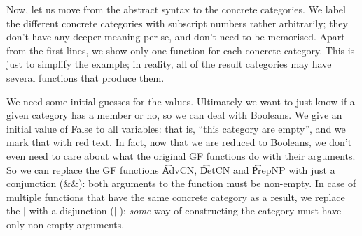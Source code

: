 Now, let us move from the \gf{} abstract syntax to the \pmcfg{} concrete
categories. We label the different concrete categories with
subscript numbers rather arbitrarily; they don't have any deeper
meaning per se, and don't need to be memorised. Apart from the first
lines, we show only one function for each concrete category. This is
just to simplify the example; in reality, all of the result categories
may have several functions that produce them.

\begin{EmptyItem}
\begin{Highlighting}[]
  \OtherTok{::=}    \FunctionTok{|}    \NormalTok{;}
  \OtherTok{::=}   \FunctionTok{|}  \NormalTok{;}
  \OtherTok{::=}    \NormalTok{;}
  \OtherTok{::=}    \NormalTok{;}
  \OtherTok{::=}    \NormalTok{;}
  \OtherTok{::=}  \NormalTok{;}
  \OtherTok{::=}  \NormalTok{;}
  \OtherTok{::=}  \NormalTok{;}
\end{Highlighting}
\end{EmptyItem}



We need some initial guesses for the values. Ultimately we want to
just know if a given category has a member or no, so we can deal with
Booleans. We give an initial value of False to all variables: that is,
``this category are empty'', and we mark that with red text.
In fact, now that we are reduced to Booleans, we don’t even need to
care about what the original GF functions do with their arguments. So
we can replace the GF functions \t{AdvCN}, \t{DetCN} and \t{PrepNP}
with just a conjunction ($\&\&$): both arguments to the function must
be non-empty. In case of multiple functions that have the same
concrete category as a result, we replace the $|$ with a disjunction
($||$): \emph{some} way of constructing the category must have only
non-empty arguments.

